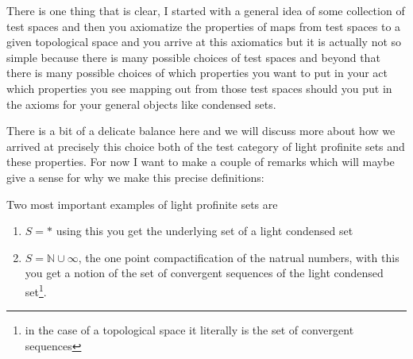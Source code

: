 There is one thing that is clear, I started with a general idea of some collection of test spaces and then you axiomatize the 
properties of maps from test spaces to a given topological space and you arrive at this axiomatics but it is actually not so 
simple because there is many possible choices of test spaces and beyond that there is many possible choices of which 
properties you want to put in your act which properties you see mapping out from those test spaces should you put in the axioms 
for your general objects like condensed sets.


There is a bit of a delicate balance here and we will discuss more about how we arrived at precisely this choice both of the 
test category of light profinite sets and these properties. For now I want to make a couple of remarks which will maybe give a 
sense for why we make this precise definitions:

\begin{remark}
    Two most important examples of light profinite sets are 
    \begin{enumerate}
        \item $S = *$ using this you get the underlying set of a light condensed set 
        \item $ S = \mathbb{N} \cup \infty$, the one point compactification of the natrual numbers, with this you get a notion of 
        the set of convergent sequences of the light condensed set\footnote{in the case of a topological space it literally is the set of convergent sequences}.
    \end{enumerate}
\end{remark}



